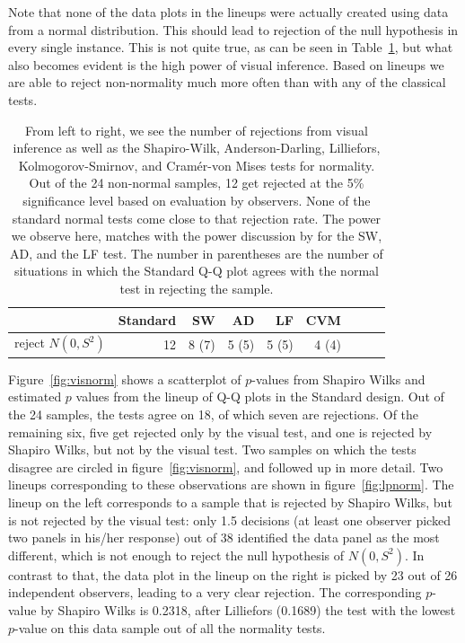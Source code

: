 \documentclass{article}\usepackage[]{graphicx}\usepackage[]{color}
\newcommand{\hh}[1]{{\color{magenta} #1}}
\begin{document}
Note that none of the data plots in the lineups were actually created using data from a normal distribution. This should lead to rejection of the null hypothesis in every single instance. This is not quite true, as can be seen in Table~\ref{tab:reject}, but what also becomes evident is the high power  of visual inference. Based on lineups we are able to reject non-normality much more often than with any of the classical tests.


\begin{table}[ht]
\centering
\caption{\label{tab:reject}
 From left to right, we see the number of rejections from visual inference as well as the  Shapiro-Wilk, Anderson-Darling, Lilliefors,  Kolmogorov-Smirnov, and Cram\'er-von Mises tests for normality. Out of the 24 non-normal samples, 12 get rejected at the 5\% significance level based on evaluation by observers. None of the standard normal tests come close to that rejection rate. The power we observe here, matches with the power discussion by \citet{razali:2011} for the SW, AD, and the LF  test. The number in parentheses are the number of situations in which the Standard Q-Q plot agrees with the normal test in rejecting the sample.}

\begin{tabular}{rrrrrrrrr}
  \hline
 & Standard  & SW & AD & LF   & CVM & \\ 
  \hline
  \hline
  reject $N(0,S^2)$  & 12  &  8 (7) & 5 (5) &  5 (5) & 4 (4) & \\ 
\end{tabular}
\end{table}
\hh{
Figure~\ref{fig:visnorm} shows a scatterplot of $p$-values from Shapiro Wilks and estimated $p$ values from the lineup of Q-Q plots in the Standard design. Out of the 24 samples, the tests agree on 18, of which seven are rejections. Of the remaining six, five get rejected only by the visual test, and one is rejected by Shapiro Wilks, but not by the visual test. Two samples on which the tests disagree are circled in figure~\ref{fig:visnorm}, and followed up in more detail. Two lineups corresponding to these observations are shown in figure~\ref{fig:lpnorm}. The lineup on the left corresponds to a sample that is rejected by Shapiro Wilks, but is not rejected by the visual test: only 1.5 decisions (at least one observer picked two panels in his/her response) out of 38 identified the data panel as the most different, which is not enough to reject the null hypothesis of $N(0, S^2)$. 
In contrast to that, the data plot in the  lineup on the right is picked by 23 out of 26 independent observers, leading to a very clear rejection. 
The corresponding $p$-value by Shapiro Wilks is 0.2318, after Lilliefors (0.1689) the test with the lowest $p$-value on this data sample out of all the normality tests.
}
\end{document}
